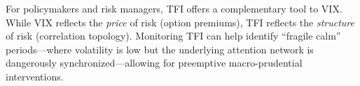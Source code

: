 \documentclass[preprint,12pt]{elsarticle}
\begin{document}
For policymakers and risk managers, TFI offers a complementary tool to VIX. While VIX reflects the \textit{price} of risk (option premiums), TFI reflects the \textit{structure} of risk (correlation topology). Monitoring TFI can help identify ``fragile calm'' periods---where volatility is low but the underlying attention network is dangerously synchronized---allowing for preemptive macro-prudential interventions.



\end{document}
